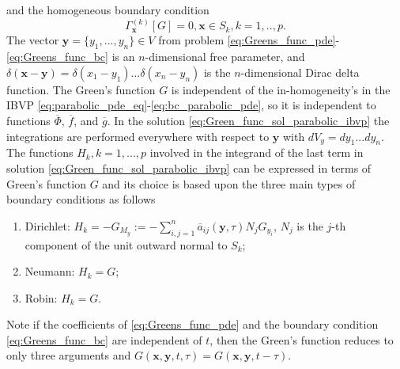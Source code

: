 \documentclass[\main/thesis.tex]{subfiles}
\begin{document}
and the homogeneous boundary condition
\begin{equation}
\Gamma_{\boldsymbol{x}}^{(k)}[G] {=} 0, \boldsymbol{x} {\in} S_k, k {=} 1, .., p.
\label{eq:Greens_func_bc}
\end{equation}
The vector $\boldsymbol{y} {=} \{y_1, ..., y_n \} {\in} V$ from problem \eqref{eq:Greens_func_pde}-\eqref{eq:Greens_func_bc} is an\newline
$n$-dimensional free parameter, and $\delta(\boldsymbol{x} {-} \boldsymbol{y}) {=} \delta(x_1 {-} y_1)...\delta(x_n {-} y_n)$ is the\newline
$n$-dimensional Dirac delta function. The Green's function $G$ is independent of the in-homogeneity's in the IBVP 
\eqref{eq:parabolic_pde_eq}-\eqref{eq:bc_parabolic_pde}, so it is independent to functions $\overline{\Phi}$, $\overline{f}$, and $\overline{g}$.
In the solution \eqref{eq:Green_func_sol_parabolic_ibvp} the integrations are performed everywhere with respect to $\boldsymbol{y}$ with $dV_y {=} dy_1...dy_n$.
The functions $H_k, k{=}1, ..., p$ involved in the integrand of the last term in solution \eqref{eq:Green_func_sol_parabolic_ibvp} can be expressed in terms of Green's function $G$ and its choice is based upon the three main types of boundary conditions as follows
\begin{enumerate}
\item Dirichlet: $H_k {=} {-}G_{M_y} {:=} {-}\sum_{i, j {=} 1}^{n} \overline{a}_{ij}(\boldsymbol{y}, \tau) N_j G_{y_i}$, 
                 $N_j$ is the $j$-th \\ \hspace*{1.75cm} component of the unit outward normal to $S_k$;
\item Neumann: $H_k {=} G$;
\item Robin: $H_k {=} G$.
\end{enumerate}
Note if the coefficients of \eqref{eq:Greens_func_pde} and the boundary condition \eqref{eq:Greens_func_bc} are independent of $t$, then  
the Green's function reduces to only three arguments and $G(\boldsymbol{x}, \boldsymbol{y}, t, \tau) {=} G(\boldsymbol{x}, \boldsymbol{y}, t{-}\tau)$.
\end{document}

